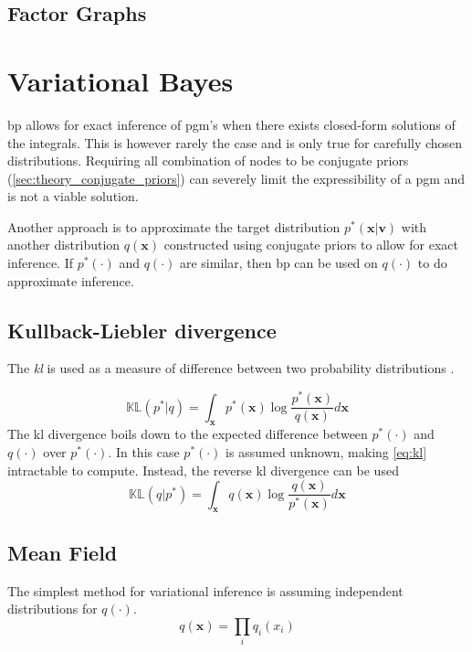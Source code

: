\subsection{Factor Graphs}
\section{Variational Bayes}
\acrshort{bp} allows for exact inference of \acrshort{pgm}'s when there exists closed-form solutions of the integrals. This is however rarely the case and is only true for carefully chosen distributions. Requiring all combination of nodes to be conjugate priors (\cref{sec:theory_conjugate_priors}) can severely limit the expressibility of a \acrshort{pgm} and is not a viable solution. 

Another approach is to approximate the target distribution $p^*(\mathbf{x} | \mathbf{v})$ with another distribution $q(\mathbf{x})$ constructed using conjugate priors to allow for exact inference. If $p^*(\cdot)$ and $q(\cdot)$ are similar, then \acrshort{bp} can be used on $q(\cdot)$ to do approximate inference.

\subsection{Kullback-Liebler divergence}
The \textit{\acrfull{kl}}  is used as a measure of difference between two probability distributions \cite{kullback1951,murphy}.

\begin{equation}\label{eq:kl}
    \mathbb{KL}(p^* | q) = \int_\mathbf{x} p^*(\mathbf{x}) \log \frac{p^*(\mathbf{x})}{q(\mathbf{x})} d\mathbf{x}
\end{equation}
The \acrshort{kl} divergence boils down to the expected difference between $p^*(\cdot)$ and $q(\cdot)$ over $p^*(\cdot)$.
In this case $p^*(\cdot)$ is assumed unknown, making \cref{eq:kl} intractable to compute. Instead, the reverse \acrshort{kl} divergence can be used 
\begin{equation}\label{eq:reverse_kl}
    \mathbb{KL}(q | p^*) = \int_\mathbf{x} q(\mathbf{x}) \log \frac{q(\mathbf{x})}{p^*(\mathbf{x})} d\mathbf{x}
\end{equation}

\subsection{Mean Field}
The simplest method for variational inference is assuming independent distributions for $q(\cdot)$.
\begin{equation}
    q(\mathbf{x}) = \prod_i q_i(x_i)
\end{equation}

